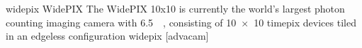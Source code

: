 \newglsXequipment%
{widepix}%
{WidePIX}%
{The WidePIX {10x10} is currently the world's largest photon counting imaging camera with \SI{6.5}{\mega\pixel}, consisting of \num{10x10} \gls{timepix} devices tiled in an edgeless configuration}%
{widepix}%
[advacam]%
